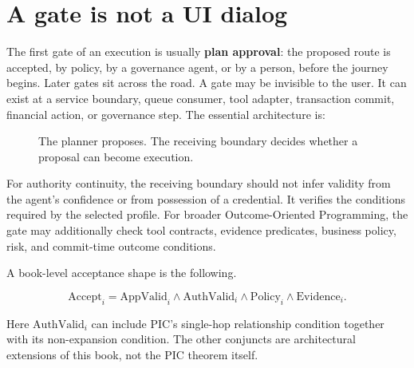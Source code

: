 \documentclass[10pt,oneside,openany]{book}
\newcommand{\term}[1]{\textbf{#1}}
\begin{document}
\section{A gate is not a UI dialog}
The first gate of an execution is usually \term{plan approval}: the proposed route is accepted, by policy, by a governance agent, or by a person, before the journey begins. Later gates sit across the road. A gate may be invisible to the user. It can exist at a service boundary, queue consumer, tool adapter, transaction commit, financial action, or governance step. The essential architecture is:

\begin{figure}[H]
\centering
{}
\caption{The planner proposes. The receiving boundary decides whether a proposal can become execution.}
\end{figure}

For authority continuity, the receiving boundary should not infer validity from the agent's confidence or from possession of a credential. It verifies the conditions required by the selected profile. For broader Outcome-Oriented Programming, the gate may additionally check tool contracts, evidence predicates, business policy, risk, and commit-time outcome conditions.

A book-level acceptance shape is the following.
\begin{formulabox}
\[
\mathrm{Accept}_i =
\mathrm{AppValid}_i \land
\mathrm{AuthValid}_i \land
\mathrm{Policy}_i \land
\mathrm{Evidence}_i.
\]
\end{formulabox}
Here $\mathrm{AuthValid}_i$ can include PIC's single-hop relationship condition together with its non-expansion condition. The other conjuncts are architectural extensions of this book, not the PIC theorem itself.
\end{document}
